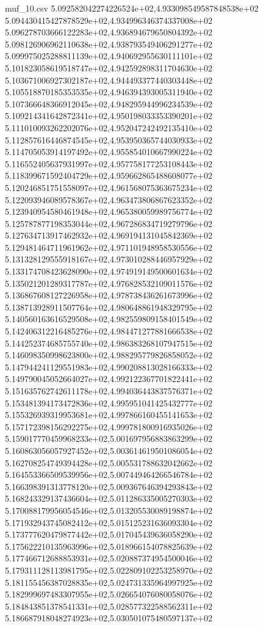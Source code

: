\begin{filecontents*}{muf_10.csv}
5.092582042274226524e+02,4.933098549587848538e+02
5.094430415427878529e+02,4.934996346374337008e+02
5.096278703666122283e+02,4.936894679650804392e+02
5.098126906962110638e+02,4.938793549406291277e+02
5.099975025288811139e+02,4.940692955630111101e+02
5.101823058619518747e+02,4.942592898311704630e+02
5.103671006927302187e+02,4.944493377440303448e+02
5.105518870185353535e+02,4.946394393005311940e+02
5.107366648366912045e+02,4.948295944996234539e+02
5.109214341642872341e+02,4.950198033353390201e+02
5.111010093262202076e+02,4.952047242492135410e+02
5.112857616446874545e+02,4.953950365744030933e+02
5.114705053914197492e+02,4.955854010667990224e+02
5.116552405637931997e+02,4.957758177253108443e+02
5.118399671592404729e+02,4.959662865488608077e+02
5.120246851751558097e+02,4.961568075363675234e+02
5.122093946089578367e+02,4.963473806867623352e+02
5.123940954580461948e+02,4.965380059989756774e+02
5.125787877198353044e+02,4.967286834719279796e+02
5.127634713917462932e+02,4.969194131045842369e+02
5.129481464711961962e+02,4.971101948958530556e+02
5.131328129555918167e+02,4.973010288446957929e+02
5.133174708423628090e+02,4.974919149500601634e+02
5.135021201289317787e+02,4.976828532109011576e+02
5.136867608127226958e+02,4.978738436261673996e+02
5.138713928911507764e+02,4.980648861948329795e+02
5.140560163616529508e+02,4.982559809158401549e+02
5.142406312216485276e+02,4.984471277881666538e+02
5.144252374685755740e+02,4.986383268107947515e+02
5.146098350998623800e+02,4.988295779826858052e+02
5.147944241129551983e+02,4.990208813028166333e+02
5.149790045052664027e+02,4.992122367701822441e+02
5.151635762742611178e+02,4.994036443837576371e+02
5.153481394173472836e+02,4.995951041425432777e+02
5.155326939319953681e+02,4.997866160455141653e+02
5.157172398156292275e+02,4.999781800916935026e+02
5.159017770459968233e+02,5.001697956883863299e+02
5.160863056057927452e+02,5.003614619501086054e+02
5.162708254749394428e+02,5.005531788632042662e+02
5.164553366509539956e+02,5.007449464266546784e+02
5.166398391313778120e+02,5.009367646394293843e+02
5.168243329137436604e+02,5.011286335005270303e+02
5.170088179956054546e+02,5.013205530089198874e+02
5.171932943745082412e+02,5.015125231636093304e+02
5.173777620479877442e+02,5.017045439636058290e+02
5.175622210135963996e+02,5.018966154078825639e+02
5.177466712688853931e+02,5.020887374954500046e+02
5.179311128113981795e+02,5.022809102253258970e+02
5.181155456387028835e+02,5.024731335964997925e+02
5.182999697483307955e+02,5.026654076080058076e+02
5.184843851378541331e+02,5.028577322588562311e+02
5.186687918048274923e+02,5.030501075480597137e+02

\end{filecontents*}
